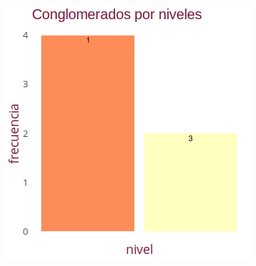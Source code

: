 \documentclass[10,a4paperpaper,]{article}
\begin{document}
\begin{figure}[!htb]
\begin{minipage}{0.3\textwidth}
  \end{minipage}
    \begin{minipage}{0.3\textwidth}
    \centering
    \includegraphics[width=1.1\linewidth]{figures/conglo.png}
  \end{minipage}
\end{figure}
\end{document}
